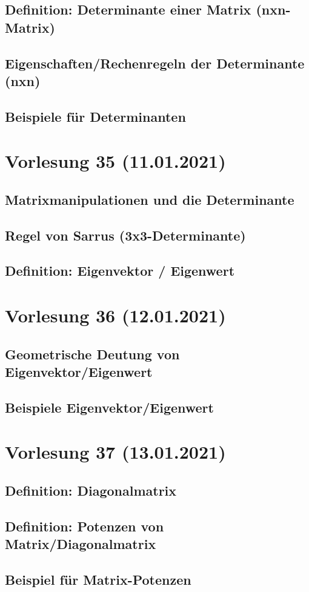 \documentclass[]{article}
\begin{document}
\subsection{Definition: Determinante einer Matrix (nxn-Matrix)}
\subsection{Eigenschaften/Rechenregeln der Determinante (nxn)}
\subsection{Beispiele für Determinanten}


\section{Vorlesung 35 (11.01.2021)}
\subsection{Matrixmanipulationen und die Determinante}
\subsection{Regel von Sarrus (3x3-Determinante)}
\subsection{Definition: Eigenvektor / Eigenwert}


\section{Vorlesung 36 (12.01.2021)}
\subsection{Geometrische Deutung von Eigenvektor/Eigenwert}
\subsection{Beispiele Eigenvektor/Eigenwert}


\section{Vorlesung 37 (13.01.2021)}
\subsection{Definition: Diagonalmatrix}
\subsection{Definition: Potenzen von Matrix/Diagonalmatrix}
\subsection{Beispiel für Matrix-Potenzen}
% 
\end{document}
